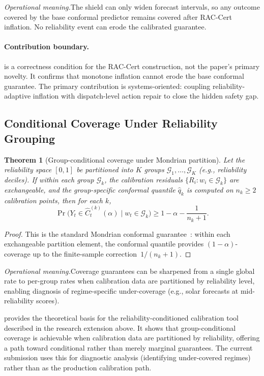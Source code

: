 \documentclass[11pt,a4paper]{article}
\newtheorem{theorem}{Theorem}
\begin{document}
\noindent\textit{Operational meaning.}\enspace The shield can only widen forecast intervals, so any outcome covered by the base conformal predictor remains covered after RAC-Cert inflation. No reliability event can erode the calibrated guarantee.

\paragraph{Contribution boundary.}
 is a correctness condition for the RAC-Cert construction, not the paper's primary novelty. It confirms that monotone inflation cannot erode the base conformal guarantee. The primary contribution is systems-oriented: coupling reliability-adaptive inflation with dispatch-level action repair to close the hidden safety gap.

\subsection{Conditional Coverage Under Reliability Grouping}

\begin{theorem}[Group-conditional coverage under Mondrian partition]\label{thm:conditional_coverage}
Let the reliability space $[0,1]$ be partitioned into $K$ groups $\mathcal{G}_1,\dots,\mathcal{G}_K$ (e.g., reliability deciles). If within each group $\mathcal{G}_k$, the calibration residuals $\{R_i : w_i \in \mathcal{G}_k\}$ are exchangeable, and the group-specific conformal quantile $\hat{q}_k$ is computed on $n_k \ge 2$ calibration points, then for each $k$,
\[
  \Pr\!\bigl(Y_t \in \hat{C}_t^{(k)}(\alpha) \mid w_t \in \mathcal{G}_k\bigr) \ge 1-\alpha -\frac{1}{n_k+1}.
\]
\end{theorem}
\begin{proof}
This is the standard Mondrian conformal guarantee~\cite{vovk2005conformal}: within each exchangeable partition element, the conformal quantile provides $(1-\alpha)$-coverage up to the finite-sample correction~$1/(n_k+1)$.
\end{proof}

\noindent\textit{Operational meaning.}\enspace Coverage guarantees can be sharpened from a single global rate to per-group rates when calibration data are partitioned by reliability level, enabling diagnosis of regime-specific under-coverage (e.g., solar forecasts at mid-reliability scores).

 provides the theoretical basis for the reliability-conditioned calibration tool described in the research extension above. It shows that group-conditional coverage is achievable when calibration data are partitioned by reliability, offering a path toward conditional rather than merely marginal guarantees. The current submission uses this for diagnostic analysis (identifying under-covered regimes) rather than as the production calibration path.
\end{document}
